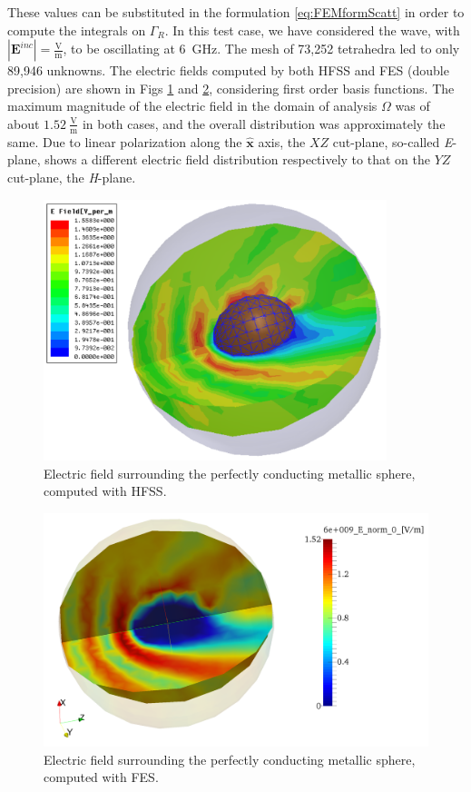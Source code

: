 These values can be substituted in the formulation \ref{eq:FEMformScatt} in order to compute the integrals on $\Gamma_R$. In this test case, we have considered the wave, with $| \mathbf{E}^{inc}| = \frac{\mathrm{V}}{\mathrm{m}}$, to be oscillating at 6~GHz. The mesh of 73,252 tetrahedra led to only 89,946 unknowns. The electric fields computed by both HFSS and FES (double precision) are shown in Figs \ref{fig:SphereHFSS} and \ref{fig:SphereField}, considering first order basis functions. The maximum magnitude of the electric field in the domain of analysis $\Omega$ was of about $1.52~\frac{\mathrm{V}}{\mathrm{m}}$ in both cases, and the overall distribution was approximately the same. Due to linear polarization along the $\hat{\mathbf{x}}$ axis, the $XZ$ cut-plane, so-called \textit{E}-plane, shows a different electric field distribution respectively to that on the $YZ$ cut-plane, the \textit{H}-plane.

\begin{figure}[ht!]
\centering
\includegraphics[width=10cm]{SphereHFSS}
\caption{Electric field surrounding the perfectly conducting metallic sphere, computed with HFSS.}
\label{fig:SphereHFSS}
\end{figure}
\begin{figure}[ht!]
\centering
\includegraphics[width=13cm]{SphereField}
\caption{Electric field surrounding the perfectly conducting metallic sphere, computed with FES.}
\label{fig:SphereField}
\end{figure}

